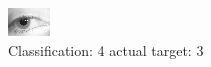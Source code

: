 \begin{figure}[h!]
\begin{center}
\includegraphics[width=0.60\columnwidth]{figures/ID1403_class_4_target_3.png}
\end{center}
\caption{ Classification: 4 actual target: 3}
\label{fig:ID1403_class_4_target_3}
\end{figure}
